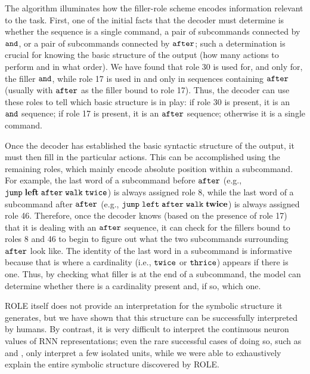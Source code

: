 The algorithm illuminates how the filler-role scheme encodes information relevant to the task. First, one of the initial facts that the decoder must determine is whether the sequence is a single command, a pair of subcommands connected by \textcolor{violet}{${\mathtt{and}}$}, or a pair of subcommands connected by \textcolor{violet}{${\mathtt{after}}$}; such a determination is crucial for knowing the basic structure of the output (how many actions to perform and in what order). We have found that role 30 is used for, and only for, the filler \textcolor{violet}{${\mathtt{and}}$}, while role 17 is used in and only in sequences containing \textcolor{violet}{${\mathtt{after}}$} (usually with \textcolor{violet}{${\mathtt{after}}$} as the filler bound to role 17). Thus, the decoder can use these roles to tell which basic structure is in play: if role 30 is present, it is an \textcolor{violet}{${\mathtt{and}}$} sequence; if role 17 is present, it is an \textcolor{violet}{${\mathtt{after}}$} sequence; otherwise it is a single command.

Once the decoder has established the basic syntactic structure of the output, it must then fill in the particular actions. This can be accomplished using the remaining roles, which mainly encode absolute position within a subcommand. For example, the last word of a subcommand before \textcolor{violet}{${\mathtt{after}}$} (e.g., \textcolor{violet}{${\mathtt{jump \hspace{1mm} \textbf{left} \hspace{1mm} after \hspace{1mm} walk \hspace{1mm} twice}}$}) is always assigned role 8, while the last word of a subcommand after \textcolor{violet}{${\mathtt{after}}$} (e.g., \textcolor{violet}{${\mathtt{jump \hspace{1mm} left \hspace{1mm} after \hspace{1mm} walk \hspace{1mm} \textbf{twice}}}$}) is always assigned role 46. Therefore, once the decoder knows (based on the presence of role 17) that it is dealing with an \textcolor{violet}{${\mathtt{after}}$} sequence, it can check for the fillers bound to roles 8 and 46 to begin to figure out what the two subcommands surrounding \textcolor{violet}{${\mathtt{after}}$} look like. The identity of the last word in a subcommand is informative because that is where a cardinality (i.e., \textcolor{violet}{${\mathtt{twice}}$} or \textcolor{violet}{${\mathtt{thrice}}$}) appears if there is one. Thus, by checking what filler is at the end of a subcommand, the model can determine whether there is a cardinality present and, if so, which one.

ROLE itself does not provide an interpretation for the symbolic structure it generates, but
we have shown that this structure can be successfully interpreted by humans. By contrast, it is very difficult to interpret the continuous neuron values of RNN representations; even the rare successful cases of doing so, such as \citet{lakretz2019emergence} and \citet{mu2020compositional}, only interpret a few isolated units, while we were able to exhaustively explain the entire symbolic structure discovered by ROLE.


